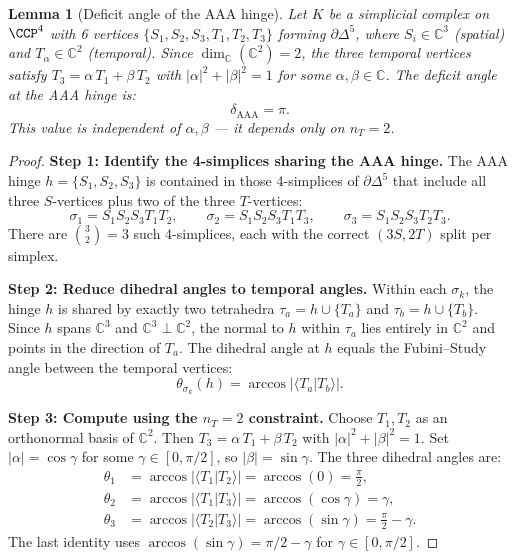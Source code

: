 \documentclass[12pt]{article}
\newtheorem{lemma}[theorem]{Lemma}
\theoremstyle{remark}
\theoremstyle{definition}
\newcommand{\CC}{\mathbb{C}}
\begin{document}
\begin{lemma}[Deficit angle of the AAA hinge]
\label{lem:delta}
Let $K$ be a simplicial complex on $\CCP^4$ with 6 vertices
$\{S_1, S_2, S_3, T_1, T_2, T_3\}$ forming $\partial\Delta^5$, where
$S_i \in \CC^3$ (spatial) and $T_\alpha \in \CC^2$ (temporal).
Since $\dim_{\CC}(\CC^2) = 2$, the three temporal vertices
satisfy $T_3 = \alpha\, T_1 + \beta\, T_2$ with
$|\alpha|^2 + |\beta|^2 = 1$ for some $\alpha, \beta \in \CC$.
The deficit angle at the AAA hinge is:
\begin{equation}
\boxed{\delta_{\mathrm{AAA}} = \pi.}
\end{equation}
This value is independent of $\alpha, \beta$ --- it depends only on $n_T = 2$.
\end{lemma}

\begin{proof}
\textbf{Step 1: Identify the 4-simplices sharing the AAA hinge.}
The AAA hinge $h = \{S_1, S_2, S_3\}$ is contained in those 4-simplices
of $\partial\Delta^5$ that include all three $S$-vertices plus two of
the three $T$-vertices:
\begin{equation}
\sigma_1 = S_1 S_2 S_3 T_1 T_2, \qquad
\sigma_2 = S_1 S_2 S_3 T_1 T_3, \qquad
\sigma_3 = S_1 S_2 S_3 T_2 T_3.
\end{equation}
There are $\binom{3}{2} = 3$ such 4-simplices, each with the correct
$(3S, 2T)$ split per simplex.

\medskip\noindent
\textbf{Step 2: Reduce dihedral angles to temporal angles.}
Within each $\sigma_k$, the hinge $h$ is shared by exactly two
tetrahedra $\tau_a = h \cup \{T_a\}$ and $\tau_b = h \cup \{T_b\}$.
Since $h$ spans $\CC^3$ and $\CC^3 \perp \CC^2$,
the normal to $h$ within $\tau_a$ lies entirely in $\CC^2$
and points in the direction of $T_a$.  The dihedral angle at $h$
equals the Fubini--Study angle between the temporal vertices:
\begin{equation}
\theta_{\sigma_k}(h) = \arccos\bigl|\langle T_a | T_b \rangle\bigr|.
\end{equation}

\medskip\noindent
\textbf{Step 3: Compute using the $n_T = 2$ constraint.}
Choose $T_1, T_2$ as an orthonormal basis of $\CC^2$.
Then $T_3 = \alpha\, T_1 + \beta\, T_2$ with
$|\alpha|^2 + |\beta|^2 = 1$.
Set $|\alpha| = \cos\gamma$ for some $\gamma \in [0, \pi/2]$,
so $|\beta| = \sin\gamma$. The three dihedral angles are:
\begin{align}
\theta_1 &= \arccos|\langle T_1 | T_2 \rangle|
         = \arccos(0) = \frac{\pi}{2}, \\
\theta_2 &= \arccos|\langle T_1 | T_3 \rangle|
         = \arccos(\cos\gamma) = \gamma, \\
\theta_3 &= \arccos|\langle T_2 | T_3 \rangle|
         = \arccos(\sin\gamma) = \frac{\pi}{2} - \gamma.
\end{align}
The last identity uses $\arccos(\sin\gamma) = \pi/2 - \gamma$
for $\gamma \in [0, \pi/2]$.


\end{proof}
\end{document}
